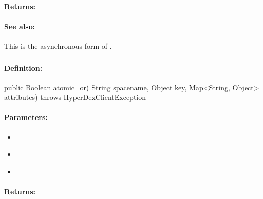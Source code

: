 \paragraph{Returns:}


\paragraph{See also:}  This is the asynchronous form of .

\pagebreak
\subsubsection{}
\label{api:java:atomic_or}


\paragraph{Definition:}
\begin{javacode}
public Boolean atomic_or(
        String spacename,
        Object key,
        Map<String, Object> attributes) throws HyperDexClientException
\end{javacode}

\paragraph{Parameters:}
\begin{itemize}[noitemsep]
\item {}\\

\item {}\\

\item {}\\

\end{itemize}

\paragraph{Returns:}


